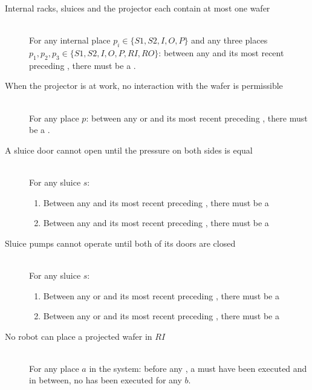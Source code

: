 \begin{description}
 
\item[Internal racks, sluices and the projector each contain at most one wafer] \hfill \\
For any internal place $p_i \in \{S1, S2, I, O, P\}$ and any three places $p_1, p_2, p_3 \in \{S1, S2, I, O, P, RI, RO\}$: between any  and its most recent preceding , there must be a . 
 
\item[When the projector is at work, no interaction with the wafer is permissible] \hfill \\
For any place $p$: between any  or  and its most recent preceding , there must be a . 
 
 \item[A sluice door cannot open until the pressure on both sides is equal] \hfill \\
 For any sluice $s$:
 \begin{enumerate}
  \item Between any  and its most recent preceding , there must be a 
  \item Between any  and its most recent preceding , there must be a 
 \end{enumerate}

 \item[Sluice pumps cannot operate until both of its doors are closed] \hfill \\
 For any sluice $s$:
 \begin{enumerate}
  \item Between any  or  and its most recent preceding , there must be a 
  \item Between any  or  and its most recent preceding , there must be a 
 \end{enumerate}

\item[No robot can place a projected wafer in $RI$] \hfill \\
For any place $a$ in the system: before any , a  must have been executed and in between, no  has been executed for any $b$.


\end{description}
